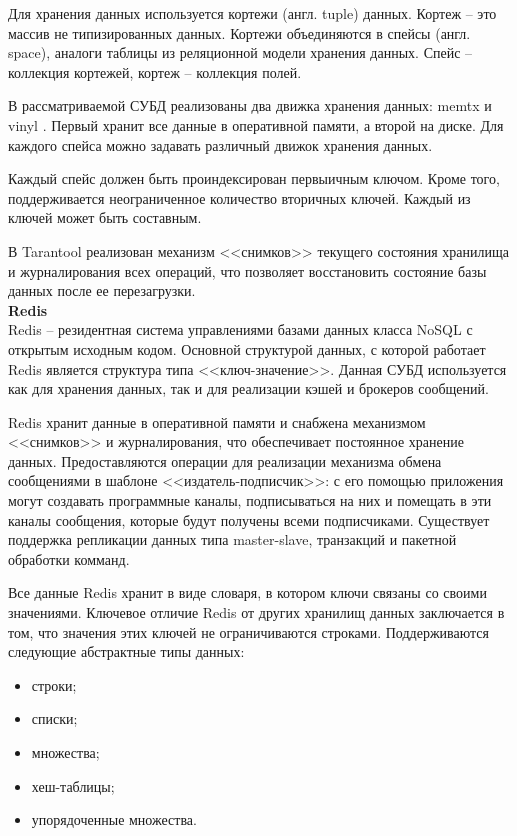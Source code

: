 Для хранения данных используется кортежи (англ. tuple) данных. Кортеж -- это массив не типизированных данных. Кортежи объединяются в спейсы (англ. space), аналоги таблицы из реляционной модели хранения данных. Спейс -- коллекция кортежей, кортеж -- коллекция полей.

В рассматриваемой СУБД реализованы два движка хранения данных: memtx \cite{memtx-vinyl} и vinyl \cite{memtx-vinyl}. Первый хранит все данные в оперативной памяти, а второй на диске. Для каждого спейса можно задавать различный движок хранения данных. 

Каждый спейс должен быть проиндексирован первыичным ключом. Кроме того, поддерживается неограниченное количество вторичных ключей. Каждый из ключей может быть составным.

В Tarantool реализован механизм <<снимков>> текущего состояния хранилища и журналирования всех операций, что позволяет восстановить состояние базы данных после ее перезагрузки.\\

\noindent\textbf{Redis}\\

Redis \cite{redis} -- резидентная система управлениями базами данных класса NoSQL с открытым исходным кодом. Основной структурой данных, с которой работает Redis является структура типа <<ключ-значение>>. Данная СУБД используется как для хранения данных, так и для реализации кэшей и брокеров сообщений.

Redis хранит данные в оперативной памяти и снабжена механизмом <<снимков>> и журналирования, что обеспечивает постоянное хранение данных. Предоставляются операции для реализации механизма обмена сообщениями в шаблоне <<издатель-подписчик>>: с его помощью приложения могут создавать программные каналы, подписываться на них и помещать в эти каналы сообщения, которые будут получены всеми подписчиками. Существует поддержка репликации данных типа master-slave, транзакций и пакетной обработки комманд.

Все данные Redis хранит в виде словаря, в котором ключи связаны со своими значениями. Ключевое отличие Redis от других хранилищ данных заключается в том, что значения этих ключей не ограничиваются строками. Поддерживаются следующие абстрактные типы данных:

\begin{itemize}
	\item строки;
	\item списки;
	\item множества;
	\item хеш-таблицы;
	\item упорядоченные множества.
\end{itemize}

